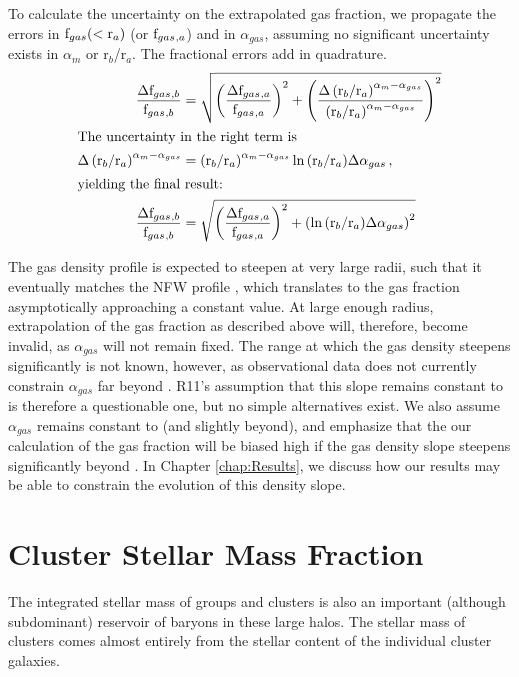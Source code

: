 To calculate the uncertainty on the extrapolated gas fraction, we
propagate the errors in $\textrm{f\ensuremath{_{gas}}}(<\textrm{r}_a)$ (or $\textrm{f\ensuremath{_{gas}}}{}_{,a}$) and in
$\alpha_{gas}$, assuming no significant uncertainty exists in
$\alpha_m$ or r$_b$/r$_a$. The fractional errors add in quadrature.
\begin{align}
\frac{\Delta\textrm{f\ensuremath{_{gas}}}{}_{,b}}{\textrm{f\ensuremath{_{gas}}}{}_{,b}} &=
\sqrt{\left(\frac{\Delta\textrm{f\ensuremath{_{gas}}}{}_{,a}}{\textrm{f\ensuremath{_{gas}}}{}_{,a}}\right)^2 +
  \left(\frac{\Delta\left(\textrm{r}_b/\textrm{r}_a\right)^{\alpha_m-\alpha_{gas}}}{\left(\textrm{r}_b/\textrm{r}_a\right)^{\alpha_m-\alpha_{gas}}}\right)^2}\nonumber\\
\intertext{The uncertainty in the right term is}
\Delta\left(\textrm{r}_b/\textrm{r}_a\right)^{\alpha_m-\alpha_{gas}}
& =
\left(\textrm{r}_b/\textrm{r}_a\right)^{\alpha_m-\alpha_{gas}}\ln{\left(\textrm{r}_b/\textrm{r}_a\right)}\Delta\alpha_{gas}\,,\nonumber\\
\intertext{yielding the final result:}
\frac{\Delta\textrm{f\ensuremath{_{gas}}}{}_{,b}}{\textrm{f\ensuremath{_{gas}}}{}_{,b}} &=
\sqrt{\left(\frac{\Delta\textrm{f\ensuremath{_{gas}}}{}_{,a}}{\textrm{f\ensuremath{_{gas}}}{}_{,a}}\right)^2 +
  \left(\ln{\left(\textrm{r}_b/\textrm{r}_a\right)}\Delta\alpha_{gas}\right)^2}
\end{align}

The gas density profile is expected to steepen at very large radii,
such that it eventually matches the NFW profile ,
which translates to the gas fraction asymptotically approaching a constant
value. At large enough radius, extrapolation of the gas fraction as
described above will, therefore, become invalid, as $\alpha_{gas}$
will not remain fixed. The range at which the gas density steepens
significantly is not known, however, as observational data does not
currently constrain $\alpha_{gas}$ far beyond \rfive. R11's assumption
that this slope remains constant to \rvir{} is therefore a
questionable one, but no simple alternatives exist. We also assume
$\alpha_{gas}$ remains constant to \rvir{} (and slightly beyond), and
emphasize that the our calculation of the gas fraction will be biased
high if the gas density slope steepens significantly beyond
\rfive{}. In Chapter \ref{chap:Results}, we discuss how our results
may be able to constrain the evolution of this density slope. 

\section{Cluster Stellar Mass Fraction}
\label{sec:Stellar}

The integrated stellar mass of groups and clusters is also an
important (although subdominant) reservoir of baryons in these large
halos. The stellar mass of clusters comes almost entirely from the
stellar content of the individual cluster galaxies.

